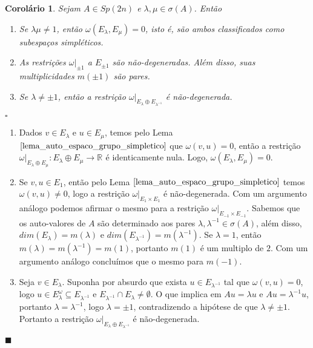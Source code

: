\documentclass[12pt]{book}
\newtheorem{corolario}[teorema]{Corolário}
\newenvironment{prova}[1]{$\square$ #1}{\hfill$\blacksquare$}
\newcommand{\formaSimpletica}[2]{\omega(#1, #2)}
\newcommand{\gruposimpletico}[1]{Sp(#1)}
\newcommand{\real}[1]{\mathbb{R}^{#1}}
\newcommand{\reta}{\real{}}
\begin{document}
	\begin{corolario}
		Sejam $A \in \gruposimpletico{2n}$ e $\lambda, \mu \in \sigma(A)$. Então 
		\begin{enumerate}
			\item Se $\lambda\mu \neq 1$, então $\formaSimpletica{E_{\lambda}}{E_{\mu}} = 0$, isto é, são ambos classificados como subespaços simpléticos.
			\item As restrições $\omega|_{\pm 1}$ a $E_{\pm 1}$ são não-degeneradas. Além disso, suas multiplicidades $m(\pm 1)$ são pares.
			\item Se $\lambda \neq \pm 1$, então a restrição $\omega|_{E_{\lambda} \oplus E_{\lambda^{-1}}}$ é não-degenerada.
		\end{enumerate}
	\end{corolario}
	\begin{prova}
		\begin{enumerate}
			\item Dados $v \in E_{\lambda}$ e $u \in E_{\mu}$, temos pelo Lema $\ref{lema_auto_espaco_grupo_simpletico}$ que $\formaSimpletica{v}{u} = 0$, então a restrição $\omega|_{E_{\lambda} \oplus E_{\mu}}:E_{\lambda} \oplus E_{\mu}\to \reta$ é identicamente nula. Logo, $\formaSimpletica{E_{\lambda} }{E_{\mu}} = 0$.
			\item Se $v, u \in E_{1}$, então pelo Lema $\ref{lema_auto_espaco_grupo_simpletico}$ temos $\formaSimpletica{v}{u} \neq 0$, logo a restrição  $\omega|_{E_{1}\times E_{1}}$ é não-degenerada. Com um argumento análogo podemos afirmar o mesmo para a restrição $\omega|_{E_{-1}\times E_{-1}}$. Sabemos que os auto-valores de $A$ são determinado aos pares $\lambda, \lambda^{-1} \in \sigma(A)$, além disso, $dim(E_{\lambda}) = m(\lambda)$ e $dim(E_{\lambda^{-1}})= m(\lambda^{-1})$. Se $\lambda = 1$, então $m(\lambda) = m(\lambda^{-1}) = m(1)$, portanto $m(1)$ é um multiplo de $2$. Com um argumento análogo concluímos que o mesmo para $m(-1)$.
			\item Seja $v\in E_{\lambda}$. Suponha por absurdo que exista $u \in E_{\lambda^{-1}}$ tal que $\formaSimpletica{v}{u} = 0$, logo $u \in E_{\lambda}^{\omega} \subseteq E_{\lambda^{-1}}$ e $E_{\lambda^{-1}}\cap E_{\lambda} \neq \emptyset$. O que implica em $Au= \lambda u $ e $Au =\lambda^{-1} u$, portanto $\lambda = \lambda^{-1}$, logo $\lambda = \pm 1$, contradizendo a hipótese de que $\lambda \neq \pm 1$. Portanto a restrição $\omega|_{E_{\lambda} \oplus E_{\lambda^{-1}}}$ é não-degenerada.
		\end{enumerate}
	\end{prova}
	
\end{document}
